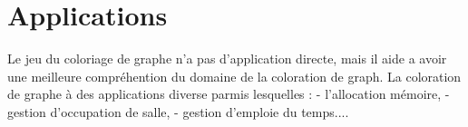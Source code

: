 \section{Applications}

Le jeu du coloriage de graphe n'a pas d'application directe, mais il aide a avoir une meilleure compréhention du domaine de la coloration de graph. 
La coloration de graphe à des applications diverse parmis lesquelles : 
- l'allocation mémoire,
- gestion d'occupation de salle, 
- gestion d'emploie du temps....


